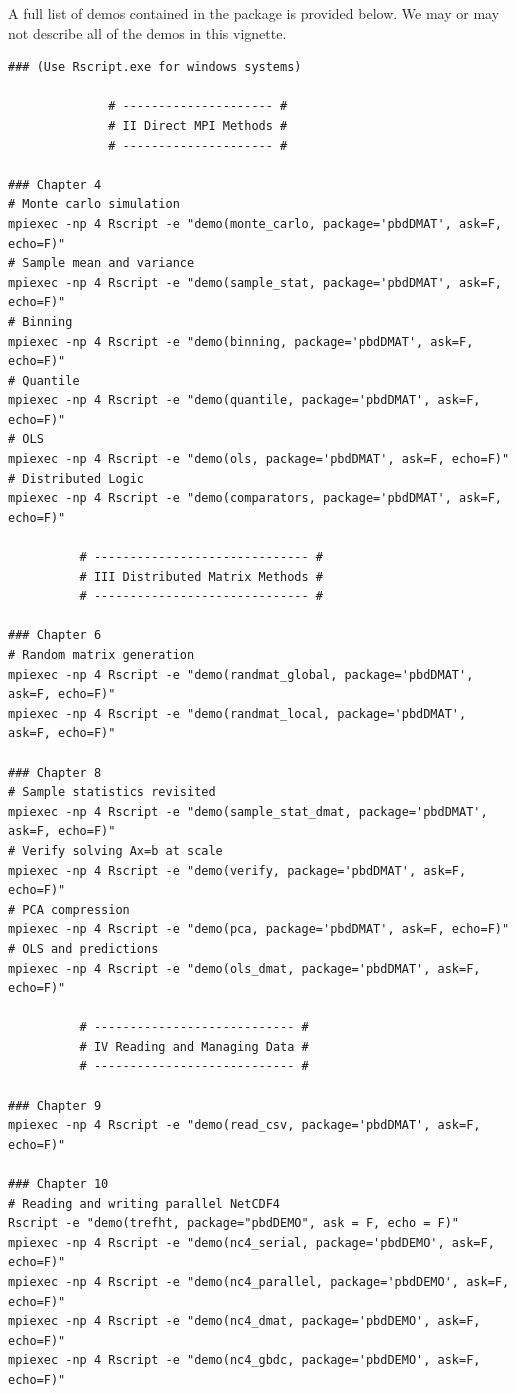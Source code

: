 A full list of demos contained in the  package is provided below.
We may or may not describe all of the demos in this vignette.

\begin{lstlisting}[title=List of Demos]
### (Use Rscript.exe for windows systems)

		      # --------------------- #
		      # II Direct MPI Methods #
		      # --------------------- #

### Chapter 4
# Monte carlo simulation
mpiexec -np 4 Rscript -e "demo(monte_carlo, package='pbdDMAT', ask=F, echo=F)"
# Sample mean and variance
mpiexec -np 4 Rscript -e "demo(sample_stat, package='pbdDMAT', ask=F, echo=F)"
# Binning
mpiexec -np 4 Rscript -e "demo(binning, package='pbdDMAT', ask=F, echo=F)"
# Quantile
mpiexec -np 4 Rscript -e "demo(quantile, package='pbdDMAT', ask=F, echo=F)"
# OLS
mpiexec -np 4 Rscript -e "demo(ols, package='pbdDMAT', ask=F, echo=F)"
# Distributed Logic
mpiexec -np 4 Rscript -e "demo(comparators, package='pbdDMAT', ask=F, echo=F)"

		  # ------------------------------ #
		  # III Distributed Matrix Methods #
		  # ------------------------------ #

### Chapter 6
# Random matrix generation
mpiexec -np 4 Rscript -e "demo(randmat_global, package='pbdDMAT', ask=F, echo=F)"
mpiexec -np 4 Rscript -e "demo(randmat_local, package='pbdDMAT', ask=F, echo=F)"

### Chapter 8
# Sample statistics revisited
mpiexec -np 4 Rscript -e "demo(sample_stat_dmat, package='pbdDMAT', ask=F, echo=F)"
# Verify solving Ax=b at scale
mpiexec -np 4 Rscript -e "demo(verify, package='pbdDMAT', ask=F, echo=F)"
# PCA compression
mpiexec -np 4 Rscript -e "demo(pca, package='pbdDMAT', ask=F, echo=F)"
# OLS and predictions
mpiexec -np 4 Rscript -e "demo(ols_dmat, package='pbdDMAT', ask=F, echo=F)"

		  # ---------------------------- #
		  # IV Reading and Managing Data #
		  # ---------------------------- #

### Chapter 9
mpiexec -np 4 Rscript -e "demo(read_csv, package='pbdDMAT', ask=F, echo=F)"

### Chapter 10
# Reading and writing parallel NetCDF4
Rscript -e "demo(trefht, package="pbdDEMO", ask = F, echo = F)"
mpiexec -np 4 Rscript -e "demo(nc4_serial, package='pbdDEMO', ask=F, echo=F)"
mpiexec -np 4 Rscript -e "demo(nc4_parallel, package='pbdDEMO', ask=F, echo=F)"
mpiexec -np 4 Rscript -e "demo(nc4_dmat, package='pbdDEMO', ask=F, echo=F)"
mpiexec -np 4 Rscript -e "demo(nc4_gbdc, package='pbdDEMO', ask=F, echo=F)"


\end{lstlisting}
